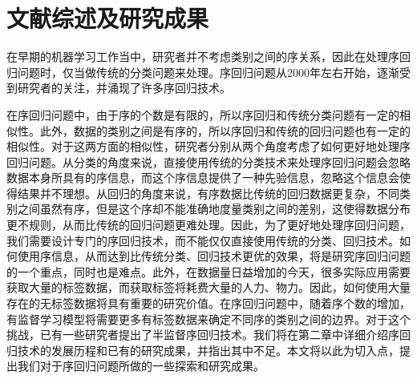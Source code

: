 
\section{文献综述及研究成果}
在早期的机器学习工作当中，研究者并不考虑类别之间的序关系，因此在处理序回归问题时，仅当做传统的分类问题来处理。序回归问题从2000年左右开始，逐渐受到研究者的关注，并涌现了许多序回归技术\citep{frank2001simple}\citep{herbrich1999support}\citep{shashua2002ranking}\citep{chu2005new}\citep{sun2010kernel}\citep{chu2005gaussian}\citep{cheng2008neural}。


在序回归问题中，由于序的个数是有限的，所以序回归和传统分类问题有一定的相似性。此外，数据的类别之间是有序的，所以序回归和传统的回归问题也有一定的相似性。对于这两方面的相似性，研究者分别从两个角度考虑了如何更好地处理序回归问题。从分类的角度来说，直接使用传统的分类技术来处理序回归问题会忽略数据本身所具有的序信息，而这个序信息提供了一种先验信息，忽略这个信息会使得结果并不理想。从回归的角度来说，有序数据比传统的回归数据更复杂，不同类别之间虽然有序，但是这个序却不能准确地度量类别之间的差别，这使得数据分布更不规则，从而比传统的回归问题更难处理。因此，为了更好地处理序回归问题，我们需要设计专门的序回归技术，而不能仅仅直接使用传统的分类、回归技术。如何使用序信息，从而达到比传统分类、回归技术更优的效果，将是研究序回归问题的一个重点，同时也是难点。此外，在数据量日益增加的今天，很多实际应用需要获取大量的标签数据，而获取标签将耗费大量的人力、物力。因此，如何使用大量存在的无标签数据将具有重要的研究价值。在序回归问题中，随着序个数的增加，有监督学习模型将需要更多有标签数据来确定不同序的类别之间的边界。对于这个挑战，已有一些研究者提出了半监督序回归技术。我们将在第二章中详细介绍序回归技术的发展历程和已有的研究成果，并指出其中不足。本文将以此为切入点，提出我们对于序回归问题所做的一些探索和研究成果。

